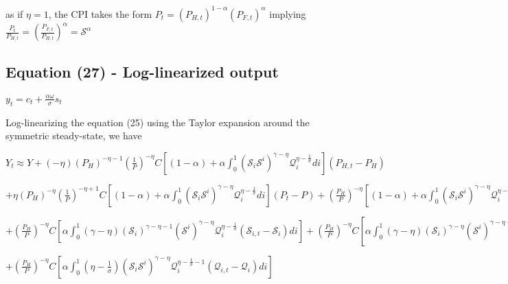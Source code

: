 \documentclass[
]{article}
\begin{document}
as if \(\eta=1\), the CPI takes the form
\(P_t=(P_{H,t})^{1-\alpha}(P_{F,t})^\alpha\) implying
\(\displaystyle \frac{P_t}{P_{H,t}}=\left( \frac{P_{F,t}}{P_{H,t}} \right)^\alpha=\mathcal{S}^\alpha\)

\vspace{12pt}

\hypertarget{equation-27---log-linearized-output}{%
\subsection{Equation (27) - Log-linearized
output}\label{equation-27---log-linearized-output}}

\(\displaystyle y_t = c_t+\frac{\alpha \omega}{\sigma}s_t\)

\vspace{8pt}

Log-linearizing the equation (25) using the Taylor expansion around the
symmetric steady-state, we have

\(\displaystyle Y_t \approx Y + (-\eta)\left( P_H \right)^{-\eta-1}\left( \frac{1}{P} \right)^{-\eta}C \left[ (1-\alpha) + \alpha \int_0^1 \left( \mathcal{S}_{i} \mathcal{S}^i\right)^{\gamma-\eta} \mathcal{Q}_i^{\eta-\frac{1}{\sigma}} di \right](P_{H,t}-P_H)\)

\(\displaystyle + \eta\left( P_H \right)^{-\eta}\left( \frac{1}{P} \right)^{-\eta+1}C \left[ (1-\alpha) + \alpha \int_0^1 \left( \mathcal{S}_{i} \mathcal{S}^i\right)^{\gamma-\eta} \mathcal{Q}_i^{\eta-\frac{1}{\sigma}} di \right](P_t-P) +\left( \frac{P_H}{P} \right)^{-\eta} \left[ (1-\alpha) + \alpha \int_0^1 \left( \mathcal{S}_{i} \mathcal{S}^i\right)^{\gamma-\eta} \mathcal{Q}_i^{\eta-\frac{1}{\sigma}} di \right](C_{t}-C)\)

\(\displaystyle +\left( \frac{P_H}{P} \right)^{-\eta} C \left[\alpha \int_0^1 (\gamma-\eta) \left( \mathcal{S}_{i} \right)^{\gamma-\eta-1} \left( \mathcal{S}^i\right)^{\gamma-\eta} \mathcal{Q}_i^{\eta-\frac{1}{\sigma}} (\mathcal{S}_{i,t}-\mathcal{S}_{i}) di \right] +\left( \frac{P_H}{P} \right)^{-\eta} C \left[\alpha \int_0^1 (\gamma-\eta) \left( \mathcal{S}_{i} \right)^{\gamma-\eta} \left( \mathcal{S}^i\right)^{\gamma-\eta-1} \mathcal{Q}_i^{\eta-\frac{1}{\sigma}} (\mathcal{S}_{t}^i-\mathcal{S}^i) di \right]\)

\(\displaystyle +\left( \frac{P_H}{P} \right)^{-\eta} C \left[\alpha \int_0^1 \left(\eta-\frac{1}{\sigma} \right) \left( \mathcal{S}_{i} \mathcal{S}^i\right)^{\gamma-\eta} \mathcal{Q}_i^{\eta-\frac{1}{\sigma}-1} (\mathcal{Q}_{i,t}-\mathcal{Q}_i) di \right]\)
\end{document}
